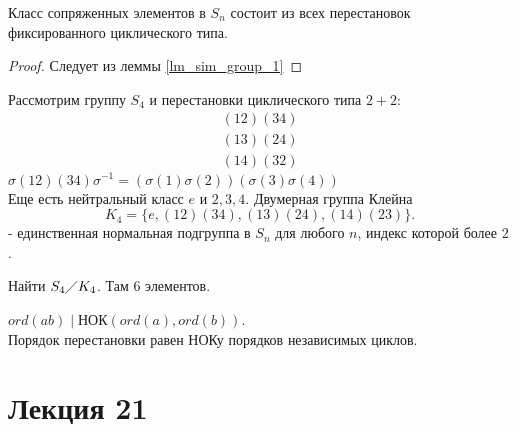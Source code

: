 \documentclass[12pt]{report}
\begin{document}
\begin{thm}
    Класс сопряженных элементов в $S_n$ состоит из всех перестановок  фиксированного циклического типа.
\end{thm}
\begin{proof}
    Следует из леммы \ref{lm_sim_group_1}
\end{proof}
\begin{ex}
   Рассмотрим группу $S_4$ и перестановки циклического типа $2+2$: 
    \[
   \begin{array}{c}
       (12)(34)\\
       (13)(24)\\
       (14)(32)
   \end{array}
   \] 
   $\sigma (12)(34) \sigma ^{-1} = (\sigma (1) \sigma (2))(\sigma (3) \sigma (4))$\\
   Еще есть нейтральный класс $e$ и $2, 3, 4$.
   Двумерная группа Клейна
   \[
      K_4 =  \{e, (12)(34), (13)(24), (14)(23)\}
   .\]  - единственная нормальная подгруппа в $S_n$ для любого $n$, индекс которой более $2$.
\end{ex}
\begin{prac}
    Найти $S_4 \diagup K_4$.  Там 6 элементов.
\end{prac}
\begin{st}
    $ord(ab) \mid \mbox{НОК} (ord(a), ord(b))$. \\
    Порядок перестановки равен НОКу порядков независимых циклов.
\end{st}
\section{Лекция 21}
\end{document}
